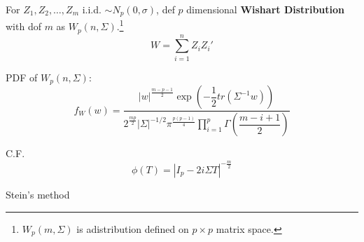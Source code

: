 \begin{itemize}[topsep=2pt,itemsep=2pt]
    For $ Z_1,Z_2,\ldots,Z_m $ i.i.d. $ \sim N_p(0,\sigma ) $, def $ p $ dimensional \textbf{Wishart Distribution } with dof $ m $ as $ W_p(n,\Sigma ) $.\footnote{$ W_p(m,\Sigma ) $ is adistribution defined on $ p\times p $ matrix space.}
    \[
        W=\sum_{i=1}^nZ_iZ_i' 
    \]
    
    PDF of $ W_p(n,\Sigma ) $:
    \[
        f_W(w)= \dfrac{|w|^{\frac{m-p-1}{2}}\exp\left( -\dfrac{1}{2}tr(\Sigma ^{-1}w) \right)}{2^{\frac{mp}{2}}|\Sigma |^{-1/2}\pi^{\frac{p(p-1)}{4}}{\displaystyle\prod_{i=1}^p\Gamma (\dfrac{m-i+1}{2})} }
    \]
    
    C.F.
    \[
        \phi(T)=|I_p-2i\Sigma T|^{-\frac{m}{2}} 
    \]
    
    
    
\end{itemize}

    


Stein's method








